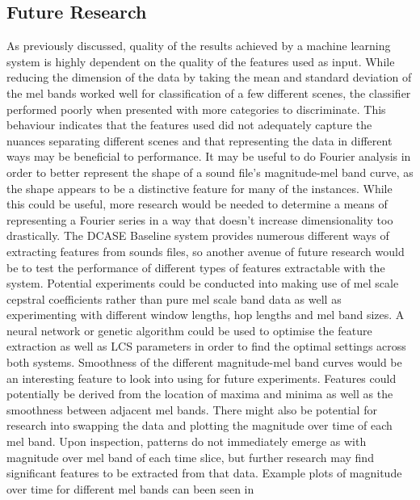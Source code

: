 \documentclass[11pt]{article}
\begin{document}
\begin{multicols}{2}
\section{Future Research}
As previously discussed, quality of the results achieved by a machine learning system is highly dependent on the quality of the features used as input. While reducing the dimension of the data by taking the mean and standard deviation of the mel bands worked well for classification of a few different scenes, the classifier performed poorly when presented with more categories to discriminate. This behaviour indicates that the features used did not adequately capture the nuances separating different scenes and that representing the data in different ways may be beneficial to performance.
It may be useful to do Fourier analysis in order to better represent the shape of a sound file’s magnitude-mel band curve, as the shape appears to be a distinctive feature for many of the instances. While this could be useful, more research would be needed to determine a means of representing a Fourier series in a way that doesn’t increase dimensionality too drastically. 
The DCASE Baseline system provides numerous different ways of extracting features from sounds files, so another avenue of future research would be to test the performance of different types of features extractable with the system. Potential experiments could be conducted into making use of mel scale cepstral coefficients rather than pure mel scale band data as well as experimenting with different window lengths, hop lengths and mel band sizes. A neural network or genetic algorithm could be used to optimise the feature extraction as well as LCS parameters in order to find the optimal settings across both systems. 
Smoothness of the different magnitude-mel band curves would be an interesting feature to look into using for future experiments. Features could potentially be derived from the location of maxima and minima as well as the smoothness between adjacent mel bands.
There might also be potential for research into swapping the data and plotting the magnitude over time of each mel band. Upon inspection, patterns do not immediately emerge as with magnitude over mel band of each time slice, but further research may find significant features to be extracted from that data. Example plots of magnitude over time for different mel bands can been seen in 





\end{multicols}
\end{document}
